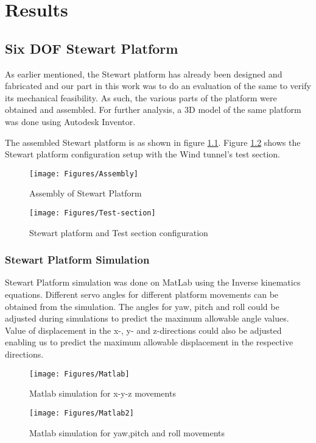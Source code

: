 \chapter{Results}
\section{Six DOF Stewart Platform}
As earlier mentioned, the Stewart platform has already been designed and fabricated and our part in this work was to do an evaluation of the same to verify its mechanical feasibility. As such, the various parts of the platform were obtained and assembled. For further analysis, a 3D model of the same platform was done using Autodesk Inventor.

The assembled Stewart platform is as shown in figure \ref{fig}. Figure \ref{fig1} shows the Stewart platform configuration setup with the Wind tunnel's test section.
\begin{center}
	\begin{figure}[!h]
	\centering
	\texttt{[image: Figures/Assembly]}
	\caption[Assembled Platform]{Assembly of Stewart Platform}
	\label{fig}
	\end{figure}
\end{center}
\begin{center}
	\begin{figure}[!h]
	\centering
	\texttt{[image: Figures/Test-section]}
	\caption[Model placement in Test Section]{Stewart platform and Test section configuration}
	\label{fig1}
	\end{figure}
\end{center}
\clearpage
\subsection{Stewart Platform Simulation}
Stewart Platform simulation was done on MatLab using the Inverse kinematics equations. Different servo angles for different platform movements can be obtained from the simulation. The angles for yaw, pitch and roll could be adjusted during simulations to predict the maximum allowable angle values. Value of displacement in the x-, y- and z-directions could also be adjusted enabling us to predict the maximum allowable displacement in the respective directions.
\begin{center}
	\begin{figure}[!h]
	\centering
	\texttt{[image: Figures/Matlab]}
	\caption[Linear displacements]{Matlab simulation for x-y-z movements}
	\end{figure}
\end{center}
\begin{center}
	\begin{figure}[!htb]
	\centering
	\texttt{[image: Figures/Matlab2]}
	\caption[Angular displacements]{Matlab simulation for yaw,pitch and roll movements}
	\end{figure}
\end{center}
